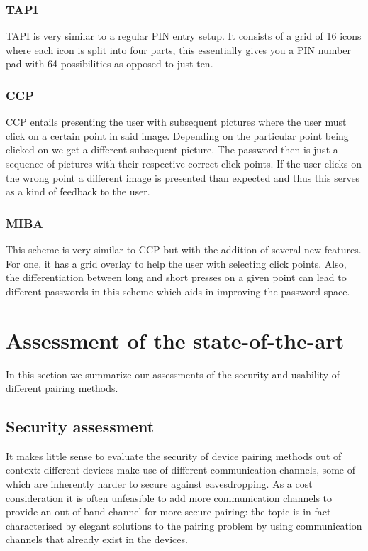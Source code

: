 \documentclass[conference, 11pt]{sty/IEEEtran}
\begin{document}
\subsubsection{TAPI}
\label{sssec:tapi}

TAPI is very similar to a regular PIN entry setup.
It consists of a grid of 16 icons where each icon is split into four parts, this essentially gives you a PIN number pad with 64 possibilities as opposed to just ten.

\subsubsection{CCP}
\label{sssec:ccp}

CCP entails presenting the user with subsequent pictures where the user must click on a certain point in said image.
Depending on the particular point being clicked on we get a different subsequent picture.
The password then is just a sequence of pictures with their respective correct click points.
If the user clicks on the wrong point a different image is presented than expected and thus this serves as a kind of feedback to the user.

\subsubsection{MIBA}
\label{sssec:miba}

This scheme is very similar to CCP but with the addition of several new features.
For one, it has a grid overlay to help the user with selecting click points.
Also, the differentiation between long and short presses on a given point can lead to different passwords in this scheme which aids in improving the password space.

\section{Assessment of the state-of-the-art}
\label{sec:assessment_of_the_state_of_the_art}

In this section we summarize our assessments of the security and usability of different pairing methods.

\subsection{Security assessment}
\label{ssec:security_assessment}

It makes little sense to evaluate the security of device pairing methods out of context: different devices make use of different communication channels, some of which are inherently harder to secure against eavesdropping.
As a cost consideration it is often unfeasible to add more communication channels to provide an out-of-band channel for more secure pairing: the topic is in fact characterised by elegant solutions to the pairing problem by using communication channels that already exist in the devices.
\end{document}
